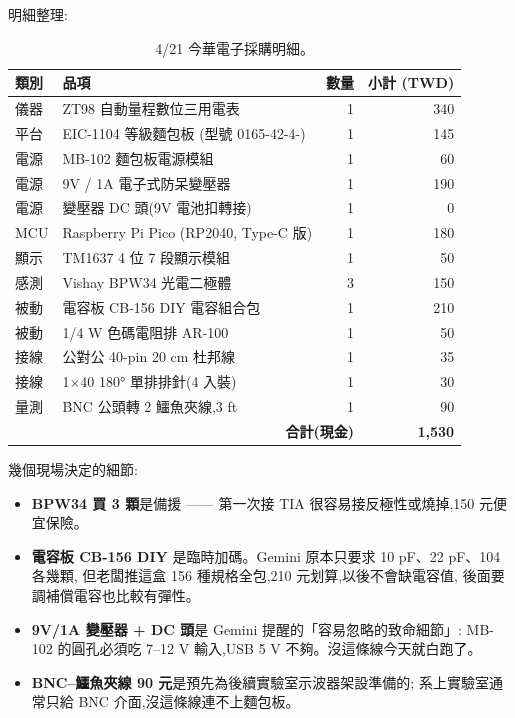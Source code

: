 明細整理:

\begin{table}[H]
  \centering
  \caption{4/21 今華電子採購明細。}
  \label{tab:0421-bom}
  \begin{tabular}{llrr}
    \toprule
    類別 & 品項 & 數量 & 小計 (TWD) \\
    \midrule
    儀器 & ZT98 自動量程數位三用電表          & 1 & 340 \\
    平台 & EIC-1104 等級麵包板 (型號 0165-42-4-)  & 1 & 145 \\
    電源 & MB-102 麵包板電源模組               & 1 & 60  \\
    電源 & 9V / 1A 電子式防呆變壓器             & 1 & 190 \\
    電源 & 變壓器 DC 頭(9V 電池扣轉接)         & 1 & 0   \\
    MCU  & Raspberry Pi Pico (RP2040, Type-C 版) & 1 & 180 \\
    顯示 & TM1637 4 位 7 段顯示模組             & 1 & 50  \\
    感測 & Vishay BPW34 光電二極體              & 3 & 150 \\
    被動 & 電容板 CB-156 DIY 電容組合包         & 1 & 210 \\
    被動 & 1/4 W 色碼電阻排 AR-100              & 1 & 50  \\
    接線 & 公對公 40-pin 20 cm 杜邦線            & 1 & 35  \\
    接線 & 1$\times$40 180° 單排排針(4 入裝)    & 1 & 30  \\
    量測 & BNC 公頭轉 2 鱷魚夾線,3 ft            & 1 & 90  \\
    \midrule
    \multicolumn{3}{r}{\textbf{合計(現金)}} & \textbf{1{,}530} \\
    \bottomrule
  \end{tabular}
\end{table}

幾個現場決定的細節:

\begin{itemize}[leftmargin=2em,itemsep=0pt]
  \item \textbf{BPW34 買 3 顆}是備援 —— 第一次接 TIA 很容易接反極性或燒掉,150 元便宜保險。
  \item \textbf{電容板 CB-156 DIY} 是臨時加碼。Gemini 原本只要求 10 pF、22 pF、104 各幾顆,
        但老闆推這盒 156 種規格全包,210 元划算,以後不會缺電容值,
        後面要調補償電容也比較有彈性。
  \item \textbf{9V/1A 變壓器 + DC 頭}是 Gemini 提醒的「容易忽略的致命細節」:
        MB-102 的圓孔必須吃 7--12 V 輸入,USB 5 V 不夠。沒這條線今天就白跑了。
  \item \textbf{BNC--鱷魚夾線 90 元}是預先為後續實驗室示波器架設準備的;
        系上實驗室通常只給 BNC 介面,沒這條線連不上麵包板。
\end{itemize}

